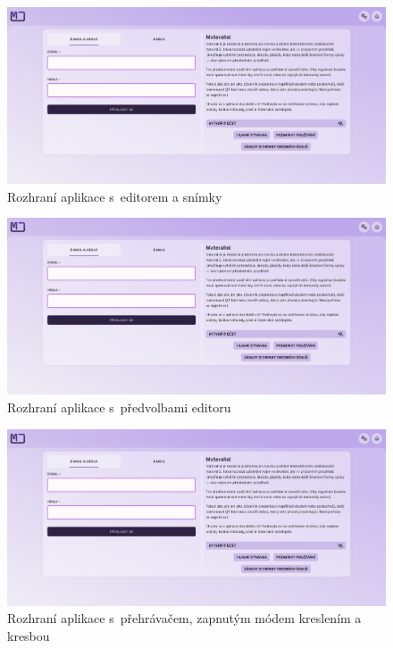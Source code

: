 \begin{figure}[ht!]
    \centering
    \includegraphics[width=1\textwidth,page=3]{media/appendix/uzivatelskeProstredi.pdf}
    \caption{Rozhraní aplikace s~editorem a snímky}
\end{figure}
\begin{figure}[ht!]
    \centering
    \includegraphics[width=1\textwidth,page=4]{media/appendix/uzivatelskeProstredi.pdf}
    \caption{Rozhraní aplikace s~předvolbami editoru}
\end{figure}

\begin{figure}[ht!]
    \centering
    \includegraphics[width=1\textwidth,page=5]{media/appendix/uzivatelskeProstredi.pdf}
    \caption{Rozhraní aplikace s~přehrávačem, zapnutým módem kreslením a kresbou}
\end{figure}


